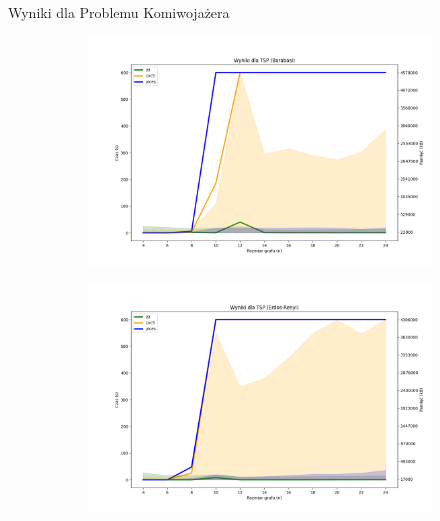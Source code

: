 \begin{frame}{Wyniki dla Problemu Komiwojażera}
	\begin{figure}[htbp]
		\centering
		\begin{subfigure}[b]{0.5\textwidth}
			\includegraphics[width=\textwidth]{../thesis/figures/7-barabasi-plot.png}
		\end{subfigure}
		\begin{subfigure}[b]{0.49\textwidth}
			\includegraphics[width=\textwidth]{../thesis/figures/7-erdos-renyi-plot.png}
		\end{subfigure}
	\end{figure}
\end{frame}
	